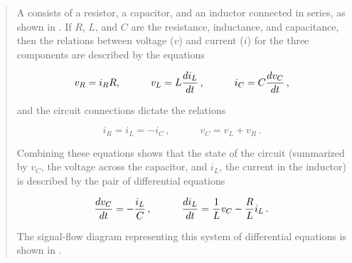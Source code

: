 \begin{quote}
 A 
consists of a resistor, a capacitor, and an inductor connected in series, as
shown in .  If \( R \), \( L \), and \( C \) are the resistance,
inductance, and capacitance, then the relations between voltage (\( v \)) and
current (\( i \)) for the three components are described by the equations
\begin{comment}

\begin{example}
v_R = i_R R

         d i_L
v_L = L -------
          d t

         d v_C
i_C = C -------
          d t
\end{example}

\end{comment}

$$ 	v_R 	= 	i_R R, \qquad\quad
	v_L 	= 	L {di_L \over dt}\,, \qquad\quad
	i_C 	= 	C {dv_C \over dt}\,, $$

and the circuit connections dictate the relations
\begin{comment}

\begin{example}
i_R = i_L = -i_C

v_C = v_L + v_R
\end{example}

\end{comment}

$$ 	i_R 	= 	i_L = -i_C\,, \qquad\quad
	v_C 	= 	v_L +  v_R\,.  $$

Combining these equations shows that the state of the circuit (summarized by
\( v_C \), the voltage across the capacitor, and \( i_L \), the current in
the inductor) is described by the pair of differential equations
\begin{comment}

\begin{example}
d v_C        i_L
-----  =  -  ---
 d t          C

d i_L      1           R
-----  =  --- v_C  -  --- i_L
 d t       L           L
\end{example}

\end{comment}

$$  {dv_C \over dt}  =  -{i_L \over C}\,, \qquad\quad
    {di_L \over dt}  =   {1   \over L} v_C - {R \over L} i_L\,. $$

The signal-flow diagram representing this system of differential equations is
shown in .
\end{quote}

